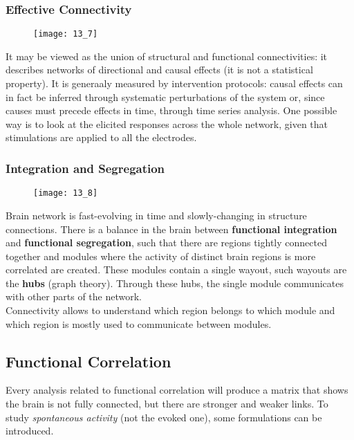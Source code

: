 \subsubsection{Effective Connectivity}
\begin{figure}[H]
    \centering
    \texttt{[image: 13\_7]}
\end{figure}
It may be viewed as the union of structural and functional connectivities: it
describes networks of directional and causal effects (it is not a statistical property).
It is generaaly measured by intervention protocols: causal effects can in fact be
inferred through systematic perturbations of the system or, since causes must precede
effects in time, through time series analysis. One possible way is to look at the
elicited responses across the whole network, given that stimulations are applied to
all the electrodes.
\subsubsection{Integration and Segregation}
\begin{figure}[H]
    \centering
    \texttt{[image: 13\_8]}
\end{figure}
Brain network is fast-evolving in time and slowly-changing in structure connections.
There is a balance in the brain between \textbf{functional integration} and
\textbf{functional segregation}, such that there are regions tightly connected
together and modules where the activity of distinct brain regions is more correlated
are created. These modules contain a single wayout, such wayouts are the \textbf{hubs}
(graph theory). Through these hubs, the single module communicates with other parts of
the network.\\
Connectivity allows to understand which region belongs to which module and which
region is mostly used to communicate between modules.

\subsection{Functional Correlation}
Every analysis related to functional correlation will produce a matrix that shows
the brain is not fully connected, but there are stronger and weaker links.
To study \textit{spontaneous activity} (not the evoked one), some formulations can be
introduced.
